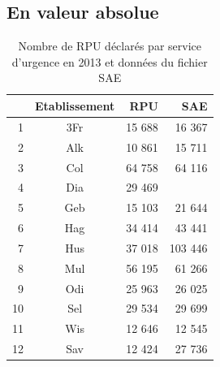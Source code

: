 \documentclass[12pt,english,french,twoside]{book}\usepackage[]{graphicx}\usepackage[]{color}
\begin{document}



\subsection*{En valeur absolue}

\begin{table}[ht]
\centering
\begin{tabular}{rcrr}
  \hline
 & Etablissement & RPU & SAE \\ 
  \hline
1 & 3Fr & 15 688 & 16 367 \\ 
  2 & Alk & 10 861 & 15 711 \\ 
  3 & Col & 64 758 & 64 116 \\ 
  4 & Dia & 29 469 &  \\ 
  5 & Geb & 15 103 & 21 644 \\ 
  6 & Hag & 34 414 & 43 441 \\ 
  7 & Hus & 37 018 & 103 446 \\ 
  8 & Mul & 56 195 & 61 266 \\ 
  9 & Odi & 25 963 & 26 025 \\ 
  10 & Sel & 29 534 & 29 699 \\ 
  11 & Wis & 12 646 & 12 545 \\ 
  12 & Sav & 12 424 & 27 736 \\ 
   \hline
\end{tabular}
\caption[Nombre de RPU par service d'urgence]{Nombre de RPU déclarés par service d'urgence en 2013 et données du fichier SAE} 
\label{fig:passage_su}
\end{table}
\end{document}
